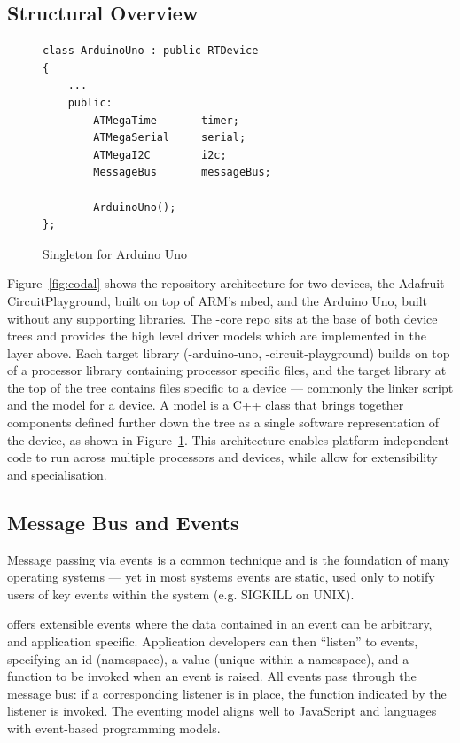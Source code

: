 \subsection{Structural Overview}

\begin{figure}
\begin{lstlisting}
class ArduinoUno : public RTDevice
{
    ...
    public:
        ATMegaTime       timer;
        ATMegaSerial     serial;
        ATMegaI2C        i2c;
        MessageBus       messageBus;

        ArduinoUno();
};
\end{lstlisting}
\caption{\label{fig:codalSingleton}Singleton for Arduino Uno}
\end{figure}

Figure~\ref{fig:codal} shows the repository architecture for two \CO devices, the Adafruit CircuitPlayground, built on top of ARM's mbed, and the Arduino Uno, built without any supporting libraries. The \COLN-core repo sits at the base of both device trees and provides the high level driver models which are implemented in the layer above. Each target library (\COLN-arduino-uno, \COLN-circuit-playground) builds on top of a processor library containing processor specific files, and the target library at the top of the tree contains files specific to a device --- commonly the linker script and the model for a device. A model is a C++ class that brings together components defined further down the tree as a single software representation of the device,
as shown in Figure~\ref{fig:codalSingleton}.
This architecture enables platform independent code to run across multiple processors and devices, while allow for extensibility and specialisation.

\subsection{Message Bus and Events}

Message passing via events is a common technique and is the foundation of many operating systems --- yet in most systems events are static, used only to notify users of key events within the system (e.g. SIGKILL on UNIX).

\CO offers extensible events where the data contained in an event can be arbitrary, and application specific. Application developers can then ``listen'' to events, specifying an id (namespace), a value (unique within a namespace), and a function to be invoked when an event is raised. All events pass through the message bus: if a corresponding listener is in place, the function indicated by the listener is invoked. The eventing model aligns well to JavaScript and languages with event-based programming models.

